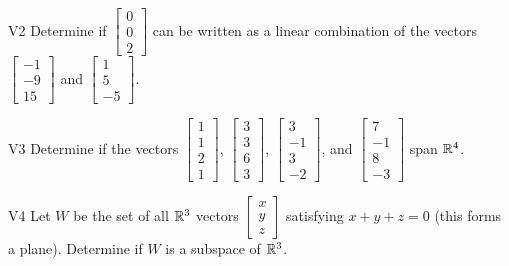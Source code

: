 \documentclass{sbgLAexam}
\begin{document}
\begin{problem}{V2}
Determine if  $\begin{bmatrix} 0 \\ 0 \\ 2 \end{bmatrix}$ can be written as a linear combination of the vectors $\begin{bmatrix} -1 \\ -9 \\ 15 \end{bmatrix}$ and $\begin{bmatrix} 1 \\ 5 \\ -5 \end{bmatrix}$.
\end{problem}
\newpage

\begin{problem}{V3}
Determine if the vectors $\begin{bmatrix} 1 \\ 1 \\ 2 \\1 \end{bmatrix}$, $\begin{bmatrix} 3 \\ 3 \\ 6 \\ 3 \end{bmatrix}$, $\begin{bmatrix}3 \\ -1 \\ 3 \\ -2\end{bmatrix}$, and $\begin{bmatrix} 7 \\ -1 \\ 8 \\ -3 \end{bmatrix}$  span $\mathbb{R}^4$.
\end{problem}

\begin{problem}{V4} Let \(W\) be the set of all \(\mathbb{R}^3\) vectors
\(\begin{bmatrix} x \\ y \\ z \end{bmatrix}\) satisfying \(x+y+z=0\) (this forms a plane).
Determine if \(W\) is a subspace of \(\mathbb{R}^3\).
\end{problem}
\newpage
\end{document}
